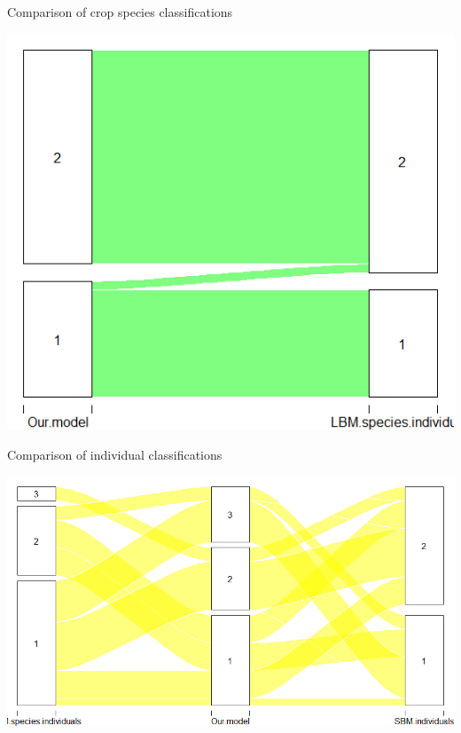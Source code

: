 \documentclass[compress,10pt]{beamer}
\begin{document}
\begin{frame}{Comparison of crop species classifications}

 \centering  

     \includegraphics[width = 0.8\linewidth]{plots/alluvial_MIRES_plants.png}

 \end{frame} 
    
\begin{frame}{Comparison of individual classifications}

 \centering  

     \includegraphics[width = \linewidth]{plots/alluvial_MIRES_individuals.png}



 \end{frame}


\end{document}
